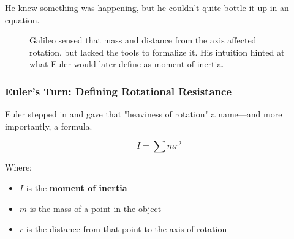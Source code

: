 He knew something was happening, but he couldn’t quite bottle it up in an equation.


\begin{figure}[H]
\centering
{}
\caption{Galileo sensed that mass and distance from the axis affected rotation, but lacked the tools to formalize it. His intuition hinted at what Euler would later define as moment of inertia.}
\end{figure}



\subsubsection{Euler’s Turn: Defining Rotational Resistance}

Euler stepped in and gave that "heaviness of rotation" a name—and more importantly, a formula.

\[
I = \sum m r^2
\]

Where:
\begin{itemize}
    \item \( I \) is the \textbf{moment of inertia}
    \item \( m \) is the mass of a point in the object
    \item \( r \) is the distance from that point to the axis of rotation
\end{itemize}

